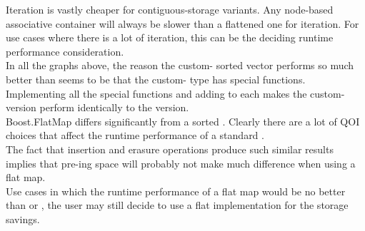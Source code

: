 Iteration is vastly cheaper for contiguous-storage variants.  Any node-based
associative container will always be slower than a flattened one for
iteration.  For use cases where there is a lot of iteration, this can be the
deciding runtime performance consideration.\\

In all the graphs above, the reason the custom- sorted vector
performs so much better than  seems to be that
the custom- type has  special functions.
Implementing all the special functions and adding  to
each makes the custom- version perform identically to the
 version.\\

Boost.FlatMap differs significantly from a sorted .  Clearly
there are a lot of QOI choices that affect the runtime performance of a
standard .\\

The fact that insertion and erasure operations produce such similar results
implies that pre-ing space will probably not make much
difference when using a flat map.\\

Use cases in which the runtime performance of a flat map would be no better
than  or , the user may still decide to use a
flat implementation for the storage savings.
